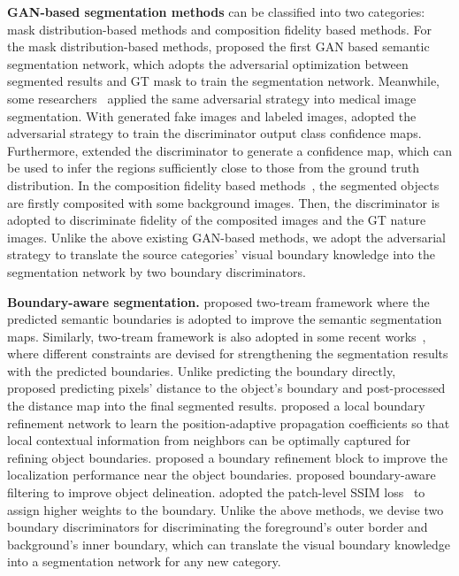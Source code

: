 \documentclass[letterpaper]{article} %
\begin{document}
\textbf{GAN-based segmentation methods} can be classified into two categories: mask distribution-based methods and composition fidelity based methods.
For the mask distribution-based methods, \citet{luc2016semantic} proposed the first GAN based semantic segmentation network, which adopts the adversarial optimization between segmented results and GT mask to train the segmentation network. Meanwhile, some researchers~\citep{arbelle2018microscopy,han2017transferring,xue2018segan:} applied the same adversarial strategy into medical image segmentation. With generated fake images and labeled images, \citet{souly2017semi} adopted the adversarial strategy to train the discriminator output class confidence maps. Furthermore, \citet{hung2018adversarial} extended the discriminator to generate a confidence map, which can be used to infer the regions sufficiently close to those from the ground truth distribution.
In the composition fidelity based methods~\citep{chen2019unsupervised,ostyakov2018seigan:,remez2018learning}, the segmented objects are firstly composited with some background images. Then, the discriminator is adopted to discriminate fidelity of the composited images and the GT nature images.
Unlike the above existing GAN-based methods, we adopt the adversarial strategy to translate the source categories' visual boundary knowledge into the segmentation network by two boundary discriminators.

\textbf{Boundary-aware segmentation.}
\citet{bertasius2016semantic} proposed two-tream framework where the predicted semantic boundaries is adopted to improve the semantic segmentation maps.
Similarly, two-tream framework is also adopted in some recent works~\citep{chen2016semantic,heng2017fusionNet:,yu2018learning,takikawa2019gated-scnn:},
where different constraints are devised for strengthening the segmentation results with the predicted boundaries.
Unlike predicting the boundary directly, ~\citet{hayder2017boundary-aware} proposed predicting pixels' distance to the object's boundary and post-processed the distance map into the final segmented results.
\citet{zhang2017global-residual} proposed a local boundary refinement network to learn the position-adaptive propagation coefficients so that local contextual information from neighbors can be optimally captured for refining object boundaries.
\citet{peng2017large} proposed a boundary refinement block to improve the localization performance near the object boundaries.
\citet{khoreva2017simple} proposed boundary-aware filtering to improve object delineation. \citet{qin2019basnet:} adopted the patch-level SSIM loss~\citep{wang2003multiscale} to assign higher weights to the boundary.
Unlike the above methods, we devise two boundary discriminators for discriminating the foreground's outer border and background's inner boundary, which can translate the visual boundary knowledge into a segmentation network for any new category.
\end{document}
